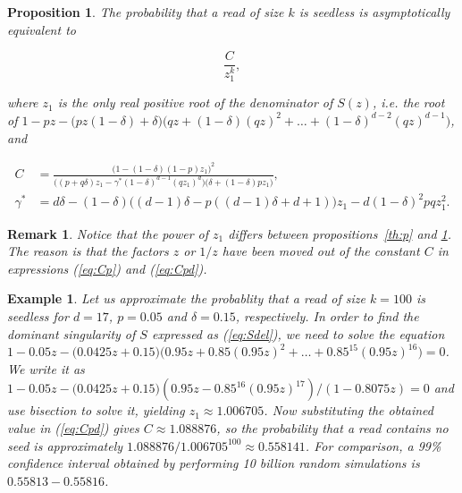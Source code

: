 \documentclass{article}
\newtheorem{example}{Example}
\newtheorem{proposition}{Proposition}
\newtheorem{remark}{Remark}
\begin{document}
\begin{proposition}
\label{th:pd}
The probability that a read of size $k$ is seedless is asymptotically
equivalent to

\begin{equation*}
\frac{C}{z_1^k},
\end{equation*}

\noindent
where $z_1$ is the only real positive root of the denominator of $S(z)$,
\textit{i.e.} the root of $1-pz - \big(pz(1-\delta) +
\delta\big)\big(qz+(1-\delta)(qz)^2 + \ldots +
(1-\delta)^{d-2}(qz)^{d-1}\big)$, and

\begin{equation}
\label{eq:Cpd}
\begin{split}
C &=
\frac{ \big(1-(1-\delta)(1-p)z_1\big)^2 }
{ \big((p+q\delta)z_1  -\gamma^*(1-\delta)^{d-1}(qz_1)^d \big)
\big(\delta+(1-\delta)pz_1\big) }, \\
\gamma^* &= d\delta -(1-\delta)\big((d-1)\delta-p((d-1)\delta+d+1)\big)z_1
- d(1-\delta)^2pqz_1^2.
\end{split}
\end{equation}
\end{proposition}

\begin{remark}
Notice that the power of $z_1$ differs between propositions~\ref{th:p} and
\ref{th:pd}. The reason is that the factors $z$ or $1/z$ have been moved
out of the constant $C$ in expressions (\ref{eq:Cp}) and (\ref{eq:Cpd}).
\end{remark}

\begin{example}
\label{ex:num2}
Let us approximate the probablity that a read of size $k = 100$ is
seedless for $d=17$, $p = 0.05$ and $\delta = 0.15$, respectively.
In order to find the dominant singularity of $S$ expressed as
(\ref{eq:Sdel}), we need to solve the equation $1-0.05z - \big(0.0425z +
0.15\big) \big(0.95z+0.85(0.95z)^2 + \ldots + 0.85^{15}(0.95z)^{16}\big) =
0$. We write it as $1-0.05z - \big(0.0425z + 0.15)
(0.95z-0.85^{16}(0.95z)^{17}) / (1-0.8075z) = 0$ and use bisection to
solve it, yielding $z_1 \approx 1.006705$. Now substituting the obtained
value in (\ref{eq:Cpd}) gives $C \approx 1.088876$, so the probability
that a read contains no seed is approximately $1.088876 / 1.006705^{100}
\approx 0.558141$. For comparison, a 99\% confidence interval obtained by
performing 10 billion random simulations is $0.55813-0.55816$.
\end{example}
\end{document}
